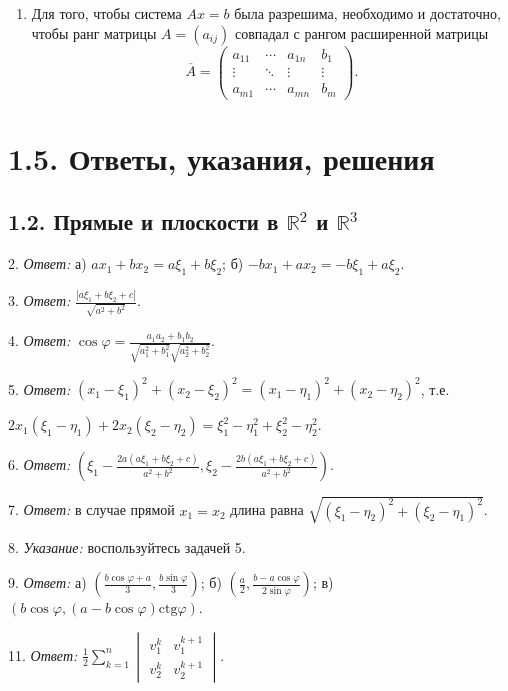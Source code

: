 \begin{enumerate}
		\item Для того, чтобы система $Ax = b$ была разрешима, необходимо и достаточно, чтобы ранг матрицы $A = (a_{ij})$ совпадал с рангом расширенной матрицы 
		\[
		\overline{A} = \begin{pmatrix}
			a_{11} & \cdots & a_{1n} & b_1 \\
			\vdots & \ddots & \vdots & \vdots \\
			a_{m1} & \cdots & a_{mn} & b_m
		\end{pmatrix}.
		\]
	\end{enumerate}

	\section{1.5. Ответы, указания, решения}

	\subsection{1.2. Прямые и плоскости в $\mathbb{R}^2$ и $\mathbb{R}^3$}

	2. \textit{Ответ:} а) $ax_1 + bx_2 = a\xi_1 + b\xi_2$; б) $-bx_1 + ax_2 = -b\xi_1 + a\xi_2$.

	3. \textit{Ответ:} $\frac{|a\xi_1 + b\xi_2 + c|}{\sqrt{a^2 + b^2}}$.

	4. \textit{Ответ:} $\cos \varphi = \frac{a_1a_2 + b_1b_2}{\sqrt{a_1^2 + b_1^2} \sqrt{a_2^2 + b_2^2}}$.

	5. \textit{Ответ:} $(x_1 - \xi_1)^2 + (x_2 - \xi_2)^2 = (x_1 - \eta_1)^2 + (x_2 - \eta_2)^2$, т.е.

	$2x_1(\xi_1 - \eta_1) + 2x_2(\xi_2 - \eta_2) = \xi_1^2 - \eta_1^2 + \xi_2^2 - \eta_2^2$.

	6. \textit{Ответ:} $\left( \xi_1 - \frac{2a(a\xi_1 + b\xi_2 + c)}{a^2 + b^2}, \xi_2 - \frac{2b(a\xi_1 + b\xi_2 + c)}{a^2 + b^2} \right)$.

	7. \textit{Ответ:} в случае прямой $x_1 = x_2$ длина равна $\sqrt{(\xi_1 - \eta_2)^2 + (\xi_2 - \eta_1)^2}$.

	8. \textit{Указание:} воспользуйтесь задачей 5.

	9. \textit{Ответ:} а) $\left( \frac{b \cos \varphi + a}{3}, \frac{b \sin \varphi}{3} \right)$; б) $\left( \frac{a}{2}, \frac{b - a \cos \varphi}{2 \sin \varphi} \right)$; в) $(b \cos \varphi, (a - b \cos \varphi) \text{ctg} \varphi)$.

	11. \textit{Ответ:} $\frac{1}{2} \sum\limits_{k=1}^n \begin{vmatrix} v^k_1 & v^{k+1}_1 \\ v^k_2 & v^{k+1}_2 \end{vmatrix}$.


